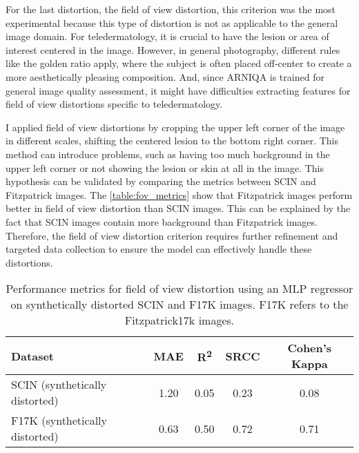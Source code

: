 \vspace{\baselineskip}
\noindent
For the last distortion, the field of view distortion, this criterion was the most experimental because this type of distortion is not as applicable to the general image domain. For teledermatology, it is crucial to have the lesion or area of interest centered in the image. However, in general photography, different rules like the golden ratio apply, where the subject is often placed off-center to create a more aesthetically pleasing composition. And, since ARNIQA is trained for general image quality assessment, it might have difficulties extracting features for field of view distortions specific to teledermatology. \par
\vspace{\baselineskip}
\noindent 
I applied field of view distortions by cropping the upper left corner of the image in different scales, shifting the centered lesion to the bottom right corner. This method can introduce problems, such as having too much background in the upper left corner or not showing the lesion or skin at all in the image. This hypothesis can be validated by comparing the metrics between SCIN and Fitzpatrick images. The \autoref{table:fov_metrics} show that Fitzpatrick images perform better in field of view distortion than SCIN images. This can be explained by the fact that SCIN images contain more background than Fitzpatrick images. Therefore, the field of view distortion criterion requires further refinement and targeted data collection to ensure the model can effectively handle these distortions. \par
 \begin{table}[ht]
    \centering
    \begin{tabular}{|l|c|c|c|c|}
        \hline
        \textbf{Dataset} & \textbf{MAE} & \textbf{R\textsuperscript{2}} & \textbf{SRCC} & \textbf{Cohen's Kappa} \\
        \hline
        SCIN (synthetically distorted) & 1.20 & 0.05 & 0.23 & 0.08 \\
        F17K (synthetically distorted) & 0.63 & 0.50 & 0.72 & 0.71 \\
        \hline
    \end{tabular}
    \caption{Performance metrics for field of view distortion using an MLP regressor on synthetically distorted SCIN and F17K images. F17K refers to the Fitzpatrick17k images.}
    \label{table:fov_metrics}
\end{table}


